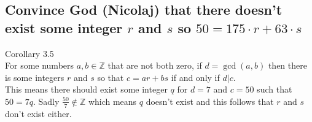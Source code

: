 \documentclass[12pt]{article}
\begin{document}
\subsection*{Convince God (Nicolaj) that there doesn't exist some integer $r$ and $s$ so $ 50 = 175 \cdot r + 63 \cdot s$}
Corollary 3.5~\cite{Algebra}\\
For some numbers $a,b \in \mathbb{Z}$ that are not both zero, if $d = \gcd(a,b)$ then there is some integers $r$ and $s$ so 
that $c = ar + bs$ if and only if $d|c$.\\
This means there should exist some integer $q$ for $d = 7$ and $c = 50$ such that $50 = 7q$. Sadly $\frac{50}{7} \notin \mathbb{Z}$ which means $q$ doesn't exist and this follows that $r$ and $s$ don't exist either.


\printbibliography
\end{document}
